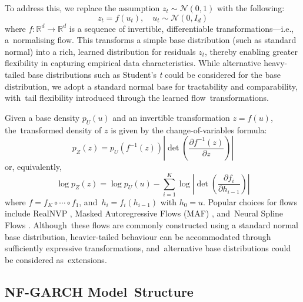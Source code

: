 \documentclass[risks,article,accept,pdftex,moreauthors]{Definitions/mdpi}
\begin{document}
To address this, we replace the assumption \( z_t \sim \mathcal{N}(0,1) \) with the following:
\[
z_t = f(u_t), \quad u_t \sim \mathcal{N}(0, I_d)
\]
where \( f: \mathbb{R}^d \rightarrow \mathbb{R}^d \) is a sequence of invertible, differentiable transformations—i.e., a~normalising flow. This transforms a simple base distribution (such as standard normal) into a rich, learned distribution for residuals \( z_t \), thereby enabling greater flexibility in capturing empirical data characteristics. While alternative heavy-tailed base distributions such as Student's \textit{t} could be considered for the base distribution, we adopt a standard normal base for tractability and comparability, with~tail flexibility introduced through the learned flow~transformations.

Given a base density \( p_U(u) \) and an invertible transformation \( z = f(u) \), the~transformed density of \( z \) is given by the change-of-variables formula:
\[
p_Z(z) = p_U(f^{-1}(z)) \left| \det \left( \frac{\partial f^{-1}(z)}{\partial z} \right) \right|
\]
or, equivalently,
\[
\log p_Z(z) = \log p_U(u) - \sum_{i=1}^K \log \left| \det \left( \frac{\partial f_i}{\partial h_{i-1}} \right) \right|
\]
where \( f = f_K \circ \cdots \circ f_1 \), and~\( h_i = f_i(h_{i-1}) \) with \( h_0 = u \). Popular choices for flows include RealNVP \citep{dinh2016density}, Masked Autoregressive Flows (MAF) \citep{papamakarios2017masked}, and~Neural Spline Flows \citep{durkan2019neural}. Although~these flows are commonly constructed using a standard normal base distribution, heavier-tailed behaviour can be accommodated through sufficiently expressive transformations, and~alternative base distributions could be considered as~extensions.

\subsection{NF-GARCH Model~Structure} 
\end{document}
